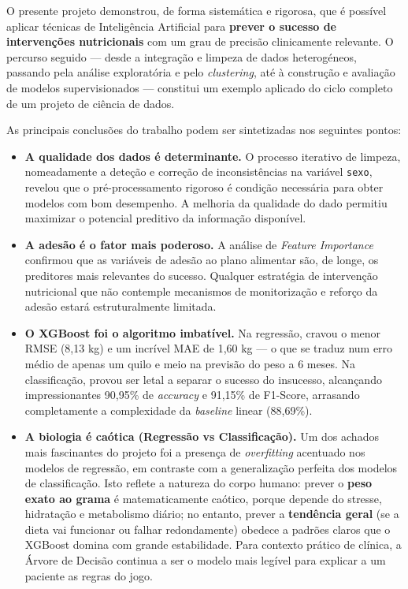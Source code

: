 O presente projeto demonstrou, de forma sistemática e rigorosa, que é possível aplicar técnicas de Inteligência Artificial para \textbf{prever o sucesso de intervenções nutricionais} com um grau de precisão clinicamente relevante. O percurso seguido --- desde a integração e limpeza de dados heterogéneos, passando pela análise exploratória e pelo \textit{clustering}, até à construção e avaliação de modelos supervisionados --- constitui um exemplo aplicado do ciclo completo de um projeto de ciência de dados.

As principais conclusões do trabalho podem ser sintetizadas nos seguintes pontos:

\begin{itemize}
    \item \textbf{A qualidade dos dados é determinante.} O processo iterativo de limpeza, nomeadamente a deteção e correção de inconsistências na variável \texttt{sexo}, revelou que o pré-processamento rigoroso é condição necessária para obter modelos com bom desempenho. A melhoria da qualidade do dado permitiu maximizar o potencial preditivo da informação disponível.

    \item \textbf{A adesão é o fator mais poderoso.} A análise de \textit{Feature Importance} confirmou que as variáveis de adesão ao plano alimentar são, de longe, os preditores mais relevantes do sucesso. Qualquer estratégia de intervenção nutricional que não contemple mecanismos de monitorização e reforço da adesão estará estruturalmente limitada.

    \item \textbf{O XGBoost foi o algoritmo imbatível.} Na regressão, cravou o menor RMSE (8,13 kg) e um incrível MAE de 1,60 kg --- o que se traduz num erro médio de apenas um quilo e meio na previsão do peso a 6 meses. Na classificação, provou ser letal a separar o sucesso do insucesso, alcançando impressionantes 90,95\% de \textit{accuracy} e 91,15\% de F1-Score, arrasando completamente a complexidade da \textit{baseline} linear (88,69\%).

    \item \textbf{A biologia é caótica (Regressão vs Classificação).} Um dos achados mais fascinantes do projeto foi a presença de \textit{overfitting} acentuado nos modelos de regressão, em contraste com a generalização perfeita dos modelos de classificação. Isto reflete a natureza do corpo humano: prever o \textbf{peso exato ao grama} é matematicamente caótico, porque depende do stresse, hidratação e metabolismo diário; no entanto, prever a \textbf{tendência geral} (se a dieta vai funcionar ou falhar redondamente) obedece a padrões claros que o XGBoost domina com grande estabilidade. Para contexto prático de clínica, a Árvore de Decisão continua a ser o modelo mais legível para explicar a um paciente as regras do jogo.


\end{itemize}

